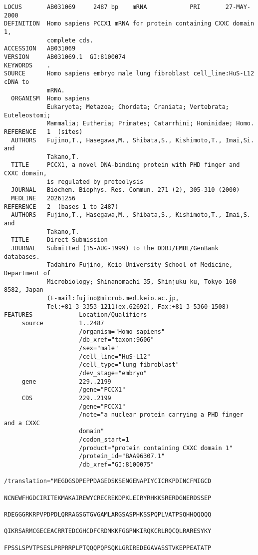\begin{lstlisting}[language={},basicstyle=\small\tt,breaklines=false]
LOCUS       AB031069     2487 bp    mRNA            PRI       27-MAY-2000
DEFINITION  Homo sapiens PCCX1 mRNA for protein containing CXXC domain 1,
            complete cds.
ACCESSION   AB031069
VERSION     AB031069.1  GI:8100074
KEYWORDS    .
SOURCE      Homo sapiens embryo male lung fibroblast cell_line:HuS-L12 cDNA to
            mRNA.
  ORGANISM  Homo sapiens
            Eukaryota; Metazoa; Chordata; Craniata; Vertebrata; Euteleostomi;
            Mammalia; Eutheria; Primates; Catarrhini; Hominidae; Homo.
REFERENCE   1  (sites)
  AUTHORS   Fujino,T., Hasegawa,M., Shibata,S., Kishimoto,T., Imai,Si. and
            Takano,T.
  TITLE     PCCX1, a novel DNA-binding protein with PHD finger and CXXC domain,
            is regulated by proteolysis
  JOURNAL   Biochem. Biophys. Res. Commun. 271 (2), 305-310 (2000)
  MEDLINE   20261256
REFERENCE   2  (bases 1 to 2487)
  AUTHORS   Fujino,T., Hasegawa,M., Shibata,S., Kishimoto,T., Imai,S. and
            Takano,T.
  TITLE     Direct Submission
  JOURNAL   Submitted (15-AUG-1999) to the DDBJ/EMBL/GenBank databases.
            Tadahiro Fujino, Keio University School of Medicine, Department of
            Microbiology; Shinanomachi 35, Shinjuku-ku, Tokyo 160-8582, Japan
            (E-mail:fujino@microb.med.keio.ac.jp,
            Tel:+81-3-3353-1211(ex.62692), Fax:+81-3-5360-1508)
FEATURES             Location/Qualifiers
     source          1..2487
                     /organism="Homo sapiens"
                     /db_xref="taxon:9606"
                     /sex="male"
                     /cell_line="HuS-L12"
                     /cell_type="lung fibroblast"
                     /dev_stage="embryo"
     gene            229..2199
                     /gene="PCCX1"
     CDS             229..2199
                     /gene="PCCX1"
                     /note="a nuclear protein carrying a PHD finger and a CXXC
                     domain"
                     /codon_start=1
                     /product="protein containing CXXC domain 1"
                     /protein_id="BAA96307.1"
                     /db_xref="GI:8100075"
                     /translation="MEGDGSDPEPPDAGEDSKSENGENAPIYCICRKPDINCFMIGCD
                     NCNEWFHGDCIRITEKMAKAIREWYCRECREKDPKLEIRYRHKKSRERDGNERDSSEP
                     RDEGGGRKRPVPDPDLQRRAGSGTGVGAMLARGSASPHKSSPQPLVATPSQHHQQQQQ
                     QIKRSARMCGECEACRRTEDCGHCDFCRDMKKFGGPNKIRQKCRLRQCQLRARESYKY
                     FPSSLSPVTPSESLPRPRRPLPTQQQPQPSQKLGRIREDEGAVASSTVKEPPEATATP

\end{lstlisting}
